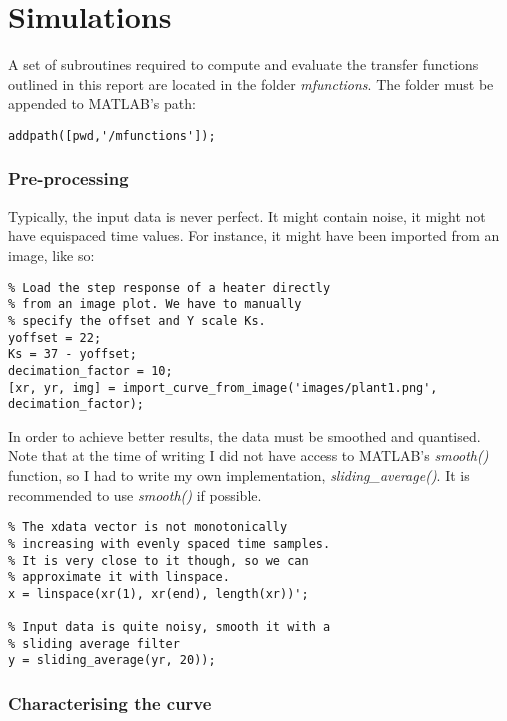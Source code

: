 \section{Simulations}

A set  of  subroutines  required  to compute and evaluate the transfer functions
outlined in this report are  located  in  the  folder  \textit{mfunctions}.  The
folder must be appended to MATLAB's path:

\begin{lstlisting}
addpath([pwd,'/mfunctions']);
\end{lstlisting}





\subsubsection*{Pre-processing}

Typically, the input data is never perfect. It might contain noise, it might not
have equispaced time values.  For  instance, it might have been imported from an
image, like so:

\begin{lstlisting}
% Load the step response of a heater directly
% from an image plot. We have to manually
% specify the offset and Y scale Ks.
yoffset = 22;
Ks = 37 - yoffset;
decimation_factor = 10;
[xr, yr, img] = import_curve_from_image('images/plant1.png', decimation_factor);
\end{lstlisting}

In order to achieve better  results,  the  data  must be smoothed and quantised.
Note  that  at  the  time   of  writing  I  did  not  have  access  to  MATLAB's
\textit{smooth()}  function,  so  I  had  to  write   my   own   implementation,
\textit{sliding\_average()}.  It  is recommended  to  use  \textit{smooth()}  if
possible.

\begin{lstlisting}
% The xdata vector is not monotonically
% increasing with evenly spaced time samples.
% It is very close to it though, so we can
% approximate it with linspace.
x = linspace(xr(1), xr(end), length(xr))';

% Input data is quite noisy, smooth it with a
% sliding average filter
y = sliding_average(yr, 20));
\end{lstlisting}


\subsubsection*{Characterising the curve}

